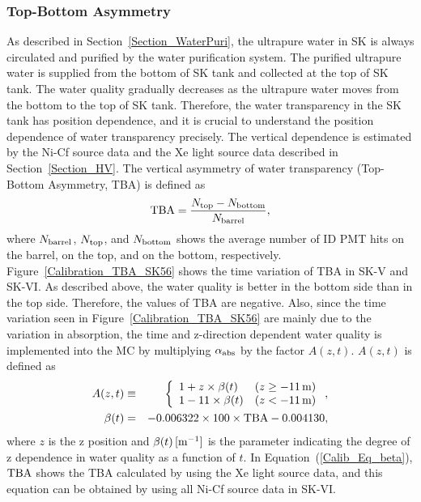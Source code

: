 \subsubsection{Top-Bottom Asymmetry}
\vs\hs
As described in Section~\ref{Section_WaterPuri}, the ultrapure water in SK is always circulated and purified by the water purification system.
The purified ultrapure water is supplied from the bottom of SK tank and collected at the top of SK tank.
The water quality gradually decreases as the ultrapure water moves from the bottom to the top of SK tank.
Therefore, the water transparency in the SK tank has position dependence, and it is crucial to understand the position dependence of water transparency precisely.
The vertical dependence is estimated by the Ni-Cf source data and the Xe light source data described in Section~\ref{Section_HV}.
The vertical asymmetry of water transparency (Top-Bottom Asymmetry, TBA) is defined as
\begin{eqnarray}
	{\rm TBA} = {N_{\rm top} - N_{\rm bottom} \over N_{\rm barrel}},
\end{eqnarray}
where $N_{\rm{barrel}}$, $N_{\rm{top}}$, and $N_{\rm{bottom}}$ shows the average number of ID PMT hits on the barrel, on the top, and on the bottom, respectively.
Figure~\ref{Calibration_TBA_SK56} shows the time variation of TBA in SK-V and SK-VI.
As described above, the water quality is better in the bottom side than in the top side.
Therefore, the values of TBA are negative.
Also, since the time variation seen in Figure~\ref{Calibration_TBA_SK56} are mainly due to the variation in absorption, the time and z-direction dependent water quality is implemented into the MC by multiplying $\alpha_{\rm{abs}}$ by the factor $A(z,t)$.
$A(z,t)$ is defined as
\begin{eqnarray}
	A(z,t) &\equiv& \left\{
	\begin{array}{ll}
		1 + z \times \beta(t) & (z\geq -11\,\rm{m}) \\
		1 - 11 \times \beta(t) & (z < -11\,\rm{m})
	\end{array} \right. , \\
		\beta(t) &=& -0.006322 \times 100 \times {\rm TBA} - 0.004130, \label{Calib_Eq_beta}
\end{eqnarray}
where $z$ is the z position and $\beta(t)\,[{\rm m}^{-1}]$ is the parameter indicating the degree of z dependence in water quality as a function of $t$.
In Equation~(\ref{Calib_Eq_beta}), ${\rm TBA}$ shows the TBA calculated by using the Xe light source data, and this equation can be obtained by using all Ni-Cf source data in SK-VI.

